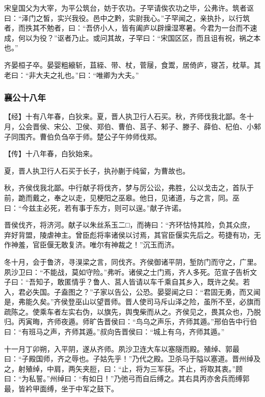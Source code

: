 \documentclass[]{article}
\begin{document}
宋皇国父为大宰，为平公筑台，妨于农功。子罕请俟农功之毕，公弗许。筑者讴曰：``泽门之皙，实兴我役。邑中之黔，实尉我心。''子罕闻之，亲执扑，以行筑者，而抶其不勉者，曰：``吾侪小人，皆有阖庐以辟燥湿寒暑。今君为一台而不速成，何以为役？''讴者乃止。或问其故，子罕曰：``宋国区区，而且诅有祝，祸之本也。''

齐晏桓子卒。晏婴粗縗斩，苴絰、带、杖，菅屦，食鬻，居倚庐，寝苫，枕草。其老曰：``非大夫之礼也。''曰：``唯卿为大夫。''

\hypertarget{header-n2055}{%
\subsubsection{襄公十八年}\label{header-n2055}}

【经】十有八年春，白狄来。夏，晋人执卫行人石买。秋，齐师伐我北鄙。冬十月，公会晋侯、宋公、卫侯、郑伯、曹伯、莒子、邾子、滕子、薛伯、杞伯、小邾子同围齐。曹伯负刍卒于师。楚公子午帅师伐郑。

【传】十八年春，白狄始来。

夏，晋人执卫行人石买于长子，执孙蒯于纯留，为曹故也。

秋，齐侯伐我北鄙。中行献子将伐齐，梦与厉公讼，弗胜，公以戈击之，首队于前，跪而戴之，奉之以走，见梗阳之巫皋。他日，见诸道，与之言，同。巫曰：``今兹主必死，若有事于东方，则可以逞。''献子许诺。

晋侯伐齐，将济河。献子以朱丝系玉二□，而祷曰：``齐环怙恃其险，负其众庶，弃好背盟，陵虐神主。曾臣彪将率诸侯以讨焉，其官臣偃实先后之。苟捷有功，无作神羞，官臣偃无敢复济。唯尔有神裁之！''沉玉而济。

冬十月，会于鲁济，寻湨梁之言，同伐齐。齐侯御诸平阴，堑防门而守之，广里。夙沙卫曰：``不能战，莫如守险。''弗听。诸侯之士门焉，齐人多死。范宣子告析文子曰：``吾知子，敢匿情乎？鲁人、莒人皆请以车千乘自其乡入，既许之矣。若入，君必失国。子盍图之？''子家以告公，公恐。晏婴闻之曰：``君固无勇，而又闻是，弗能久矣。''齐侯登巫山以望晋师。晋人使司马斥山泽之险，虽所不至，必旗而疏陈之。使乘车者左实右伪，以旗先，舆曳柴而从之。齐侯见之，畏其众也，乃脱归。丙寅晦，齐师夜遁。师旷告晋侯曰：``鸟乌之声乐，齐师其遁。''邢伯告中行伯曰：``有班马之声，齐师其遁。''叔向告晋侯曰：``城上有乌，齐师其遁。''

十一月丁卯朔，入平阴，遂从齐师。夙沙卫连大车以塞隧而殿。殖绰、郭最曰：``子殿国师，齐之辱也。子姑先乎！''乃代之殿。卫杀马于隘以塞道。晋州绰及之，射殖绰，中肩，两矢夹脰，曰：``止，将为三军获。不止，将取其衷。''顾曰：``为私誓。''州绰曰：``有如日！''乃弛弓而自后缚之。其右具丙亦舍兵而缚郭最，皆衿甲面缚，坐于中军之鼓下。
\end{document}
